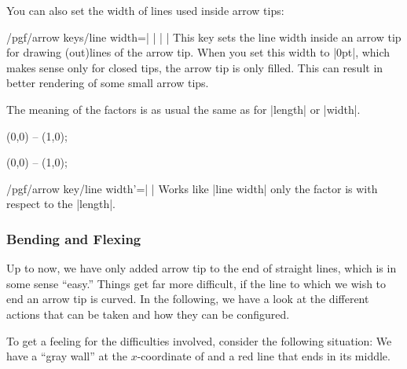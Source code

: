 You can also set the width of lines used inside arrow tips:

\begin{key}{/pgf/arrow keys/line width=| |%
    | |}
  This key sets the line width inside an arrow tip for drawing
  (out)lines of the arrow tip. When you set this width to |0pt|, which
  makes sense only for closed tips, the arrow tip is only filled. This
  can result in better rendering of some small arrow tips.

  The meaning of the factors is as usual the same as for |length| or |width|.
  
\begin{codeexample}[width=2cm]
\tikz \draw [arrows = {-Latex[line width=0.1pt, fill=white, length=10pt]}] (0,0) -- (1,0);
\end{codeexample}
\begin{codeexample}[width=2cm]
\tikz \draw [arrows = {-Latex[line width=1pt, fill=white, length=10pt]}] (0,0) -- (1,0);
\end{codeexample}
\end{key}


\begin{key}{/pgf/arrow key/line width'=| |}
  Works like |line width| only the factor is with respect to the |length|.  
\end{key}

\subsubsection{Bending and Flexing}


Up to now, we have only added arrow tip to the end of straight lines,
which is in some sense ``easy.'' Things get far more difficult, if the
line to which we wish to end an arrow tip is curved. In the following,
we have a look at the different actions that can be taken and how they
can be configured.

To get a feeling for the difficulties involved, consider the following
situation: We have a ``gray wall'' at the $x$-coordinate of and a
red line that ends in its middle.

\begin{codeexample}[]
\def\wall{ \fill     [fill=black!50]  (1,-.5) rectangle (2,.5);
           \pattern  [pattern=bricks] (1,-.5) rectangle (2,.5);
           \draw     [line width=1pt]  (1cm+.5pt,-.5) -- ++(0,1); }
\end{codeexample}

